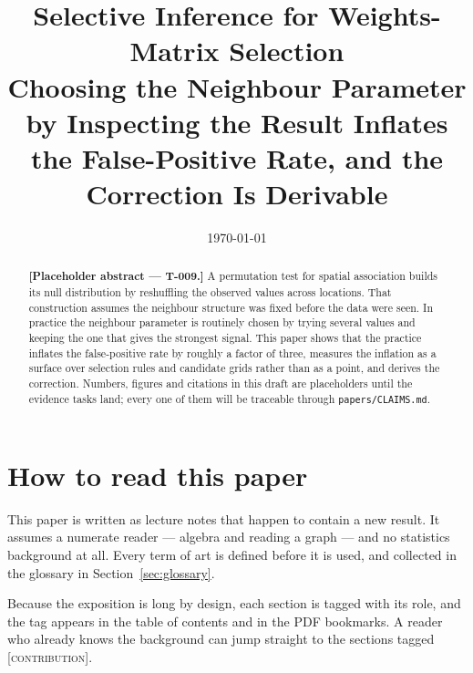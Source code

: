\documentclass[11pt,a4paper]{article}
\title{Selective Inference for Weights-Matrix Selection\\[0.3em]
  \large Choosing the Neighbour Parameter by Inspecting the Result Inflates the
  False-Positive Rate, and the Correction Is Derivable}
\author{\paperauthor}
\date{\today}
\begin{document}
\maketitle

\begin{abstract}
\noindent
\textbf{[Placeholder abstract --- T-009.]}
A permutation test for spatial association builds its null distribution by
reshuffling the observed values across locations. That construction assumes the
neighbour structure was fixed before the data were seen. In practice the
neighbour parameter is routinely chosen by trying several values and keeping the
one that gives the strongest signal. This paper shows that the practice inflates
the false-positive rate by roughly a factor of three, measures the inflation as a
surface over selection rules and candidate grids rather than as a point, and
derives the correction. Numbers, figures and citations in this draft are
placeholders until the evidence tasks land; every one of them will be traceable
through \texttt{papers/CLAIMS.md}.
\end{abstract}

\tableofcontents
\bigskip

\section{How to read this paper}
\label{sec:roadmap}

This paper is written as lecture notes that happen to contain a new result. It
assumes a numerate reader --- algebra and reading a graph --- and no statistics
background at all. Every term of art is defined before it is used, and collected
in the glossary in Section~\ref{sec:glossary}.

Because the exposition is long by design, each section is tagged with its role,
and the tag appears in the table of contents and in the PDF bookmarks. A reader
who already knows the background can jump straight to the sections tagged
\textsc{[contribution]}.
\end{document}
